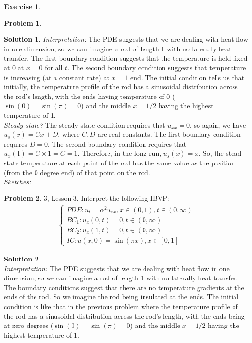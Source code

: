 \documentclass{article}
\theoremstyle{definition}
\newtheorem{sln}{Solution}[section]
\newtheorem*{prob*}{Problem}
\newtheorem*{exer*}{Exercise}
\begin{document}
\begin{exer*}
\begin{prob*}
\begin{sln}
			\textit{Interpretation:} The PDE suggests that we are dealing with heat flow in one dimension, so we can imagine a rod of length 1 with no laterally heat transfer. The first boundary condition suggests that the temperature is held fixed at 0 at $x=0$ for all $t$. The second boundary condition suggests that temperature is increasing (at a constant rate) at $x=1$ end. The initial condition tells us that initially, the temperature profile of the rod has a sinusoidal distribution across the rod's length, with the ends having temperature of 0 ($\sin(0)=\sin(\pi) = 0$) and the middle $x=1/2$ having the highest temperature of 1. \\
			
			\textit{Steady-state?} The steady-state condition requires that $u_{xx} = 0$, so again, we have $u_s(x) = Cx +D$, where $C,D$ are real constants. The first boundary condition requires $D=0$. The second boundary condition requires that $u_x(1) = C\times 1 = C = 1$. Therefore, in the long run, $u_s(x) = x$. So, the stead-state temperature at each point of the rod has the same value as the position (from the 0 degree end) of that point on the rod. \\
			
			\textit{Sketches:}
		\end{sln}
	\end{prob*}
	\newpage
	\begin{prob*}3, Lesson 3. Interpret the following IBVP:
		\begin{align*}
		\begin{cases}
		PDE: u_t = \alpha^2 u_{xx}, x\in(0,1), t\in(0,\infty)\\
		BC_1: u_x(0,t) = 0, t\in(0,\infty)\\
		BC_2: u_x(1,t) = 0, t\in(0,\infty)\\
		IC: u(x,0) = \sin(\pi x), x\in[0,1]
		\end{cases}
		\end{align*}
		\begin{sln}
			$\,$\\
			
			\textit{Interpretation:} The PDE suggests that we are dealing with heat flow in one dimension, so we can imagine a rod of length 1 with no laterally heat transfer. The boundary conditions suggest that there are no temperature gradients at the ends of the rod. So we imagine the rod being insulated at the ends. The initial condition is like that in the previous problem where the temperature profile of the rod has a sinusoidal distribution across the rod's length, with the ends being at zero degrees ($\sin(0)=\sin(\pi) = 0$) and the middle $x=1/2$ having the highest temperature of 1. \\
			

\end{sln}
\end{prob*}
\end{exer*}
\end{document}
